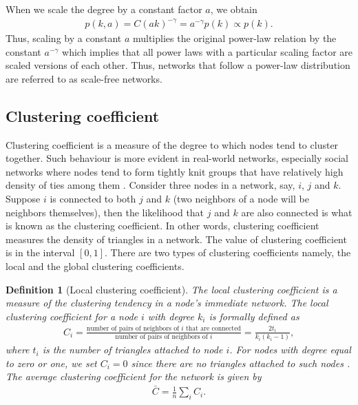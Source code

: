 \documentclass[10pt,a4paper]{article}
\newtheorem{defn}{Definition}
\begin{document}
When we scale the degree by a constant factor $a$, we obtain
\begin{eqnarray}
p(k,a) = C(ak)^{-\gamma} = a^{-\gamma} p(k) \propto p(k).
\label{scale}
\end{eqnarray}
Thus, scaling by a constant $a$ multiplies the original power-law relation by the constant $a^{-\gamma}$ which implies that all power laws with a particular scaling factor are scaled versions of each other. Thus, networks that follow a power-law distribution are referred to as scale-free networks. 

\subsection{Clustering coefficient}
Clustering coefficient is a measure of the degree to which nodes tend to cluster together. Such behaviour is more evident in real-world networks, especially social networks where nodes tend to form tightly knit groups that have relatively high density of ties among them \citep{estrada2015first}.
Consider three nodes in a network, say, $i$, $j$ and $k$. Suppose $i$ is connected to both $j$ and $k$ (two neighbors of a node will be neighbors themselves), then the likelihood that $j$ and $k$ are also connected is what is known as the clustering coefficient. In other words, clustering coefficient measures the density of triangles in a  network. 
The value of clustering coefficient is in the interval $[0,1]$. There are two types of clustering coefficients namely, the local and the global clustering coefficients.

\begin{defn}[Local clustering coefficient]
	The local clustering coefficient is a measure of the clustering tendency in a node's immediate network. The local clustering coefficient for a node $i$ with degree $k_i$ is formally defined as 
	\begin{eqnarray}
	C_i = \frac{\text{number of pairs of neighbors of } i\text{ that are connected}}{\text{number of pairs of neighbors of }i}= \frac{2 t_i}{k_i(k_i-1)},  
	\end{eqnarray}
	where $t_i$ is the number of triangles attached to node $i$. For nodes with degree equal to zero or one, we set $C_i = 0$ since there are no triangles attached to such nodes \citep{newman2010networks}. The average clustering coefficient for the network is given by
	\begin{eqnarray}
	\bar{C} = \frac{1}{n} \sum_i C_i.
	\end{eqnarray} 
\end{defn}
\end{document}
